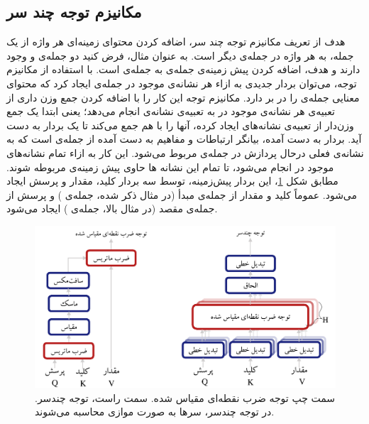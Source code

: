 \subsection{مکانیزم توجه چند سر}
هدف از تعریف مکانیزم توجه چند سر، اضافه کردن محتوای زمینه‌ای هر واژه از یک جمله، به هر واژه در جمله‌ی دیگر است. به عنوان مثال، فرض کنید دو جمله‌ی  و   وجود دارند و هدف، اضافه کردن پیش زمینه‌ی جمله‌ی  به جمله‌ی  است. با استفاده از مکانیزم توجه، می‌توان بردار جدیدی به ازاء هر نشانه‌ی موجود در جمله‌ی  ایجاد کرد که محتوای معنایی جمله‌ی  را در بر دارد. مکانیزم توجه این کار را با اضافه کردن جمع وزن داری از تعبیه‌ی هر نشانه‌ی موجود در  به تعبیه‌ی نشانه‌ی  انجام می‌دهد؛ یعنی ابتدا یک جمع وزن‌دار از تعبیه‌ی نشانه‌های  ایجاد کرده، آنها را با هم جمع می‌کند تا یک بردار به دست آید. بردار به دست آمده، بیانگر ارتباطات و مفاهیم به دست آمده از جمله‌ی  است که به نشانه‌ی فعلی درحال پردازش در جمله‌ی  مربوط می‌شود. این کار به ازاء تمام نشانه‌های موجود در  انجام می‌شود، تا تمام این نشانه ها حاوی پیش زمینه‌ی مربوطه شوند. مطابق شکل \ref{Fig:Attention}، این بردار پیش‌زمینه، توسط سه بردار کلید، مقدار و پرسش ایجاد می‌شود. عموماً کلید و مقدار از جمله‌ی مبدأ (در مثال ذکر شده، جمله‌ی ) و پرسش از جمله‌ی مقصد (در مثال بالا، جمله‌ی ) ایجاد می‌شود.
\begin{figure}[!htb]
	\centering
	\includegraphics[scale=0.7]{Figures/attention.pdf}
	\caption[سمت چپ توجه ضرب نقطه‌ای مقیاس شده]{سمت چپ توجه ضرب نقطه‌ای مقیاس شده. سمت راست، توجه چندسر. در توجه چندسر، سرها به صورت موازی محاسبه می‌شوند.}
	\label{Fig:Attention}
\end{figure}


